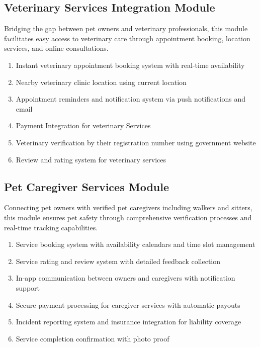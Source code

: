\subsection{Veterinary Services Integration Module}
Bridging the gap between pet owners and veterinary professionals, this module facilitates easy access to veterinary care through appointment booking, location services, and online consultations. 
\begin{enumerate}
    \item Instant veterinary appointment booking system with real-time availability
    \item Nearby veterinary clinic location using current location
    \item Appointment reminders and notification system via push notifications and email
    \item Payment Integration for veterinary Services
    \item Veterinary verification by their registration number using government website
    \item Review and rating system for veterinary services
\end{enumerate}

\subsection{Pet Caregiver Services Module}
Connecting pet owners with verified pet caregivers including walkers and sitters, this module ensures pet safety through comprehensive verification processes and real-time tracking capabilities. 
\begin{enumerate}
   
    \item Service booking system with availability calendars and time slot management

    \item Service rating and review system with detailed feedback collection
    \item In-app communication between owners and caregivers with notification support
    \item Secure payment processing for caregiver services with automatic payouts
    \item Incident reporting system and insurance integration for liability coverage
    \item Service completion confirmation with photo proof
\end{enumerate}

